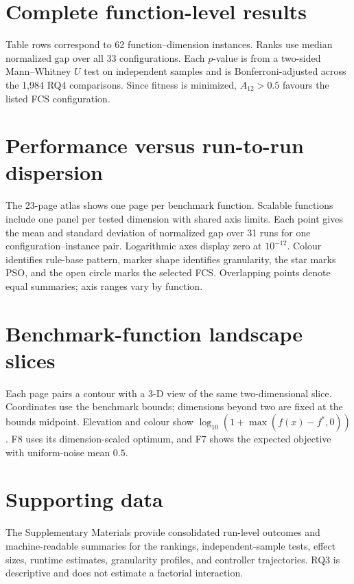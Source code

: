 \documentclass[11pt,a4paper]{article}
\begin{document}
\section{Complete function-level results}

Table rows correspond to 62 function--dimension instances. Ranks use median normalized gap over all 33 configurations. Each $p$-value is from a two-sided Mann--Whitney $U$ test on independent samples and is Bonferroni-adjusted across the 1,984 RQ4 comparisons. Since fitness is minimized, $A_{12}>0.5$ favours the listed FCS configuration.



\section{Performance versus run-to-run dispersion}

The 23-page atlas shows one page per benchmark function. Scalable functions include one panel per tested dimension with shared axis limits. Each point gives the mean and standard deviation of normalized gap over 31 runs for one configuration--instance pair. Logarithmic axes display zero at $10^{-12}$. Colour identifies rule-base pattern, marker shape identifies granularity, the star marks PSO, and the open circle marks the selected FCS. Overlapping points denote equal summaries; axis ranges vary by function.



\section{Benchmark-function landscape slices}

Each page pairs a contour with a 3-D view of the same two-dimensional slice. Coordinates use the benchmark bounds; dimensions beyond two are fixed at the bounds midpoint. Elevation and colour show $\log_{10}(1+\max(f(x)-f^*,0))$. F8 uses its dimension-scaled optimum, and F7 shows the expected objective with uniform-noise mean $0.5$.



\section{Supporting data}

The Supplementary Materials provide consolidated run-level outcomes and machine-readable summaries for the rankings, independent-sample tests, effect sizes, runtime estimates, granularity profiles, and controller trajectories. RQ3 is descriptive and does not estimate a factorial interaction.
\end{document}
